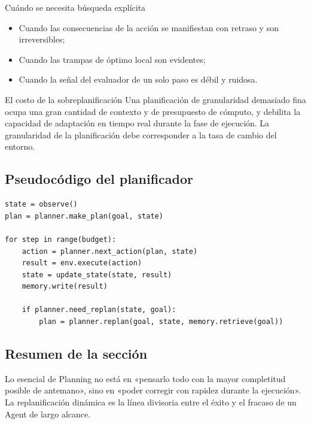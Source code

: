 \begin{knowledgebox}{Cuándo se necesita búsqueda explícita}
\begin{itemize}
    \item Cuando las consecuencias de la acción se manifiestan con retraso y son irreversibles;
    \item Cuando las trampas de óptimo local son evidentes;
    \item Cuando la señal del evaluador de un solo paso es débil y ruidosa.
\end{itemize}
\end{knowledgebox}

\begin{warningbox}{El costo de la sobreplanificación}
Una planificación de granularidad demasiado fina ocupa una gran cantidad de contexto y de presupuesto de cómputo, y debilita la capacidad de adaptación en tiempo real durante la fase de ejecución. La granularidad de la planificación debe corresponder a la tasa de cambio del entorno.
\end{warningbox}

\subsection{Pseudocódigo del planificador}
\begin{lstlisting}[caption={Un ciclo simplificado de replanificación, que enfatiza la ``actualización activada por desviación''}]
state = observe()
plan = planner.make_plan(goal, state)

for step in range(budget):
    action = planner.next_action(plan, state)
    result = env.execute(action)
    state = update_state(state, result)
    memory.write(result)

    if planner.need_replan(state, goal):
        plan = planner.replan(goal, state, memory.retrieve(goal))
\end{lstlisting}

\subsection{Resumen de la sección}
Lo esencial de Planning no está en «pensarlo todo con la mayor completitud posible de antemano», sino en «poder corregir con rapidez durante la ejecución». La replanificación dinámica es la línea divisoria entre el éxito y el fracaso de un Agent de largo alcance.

